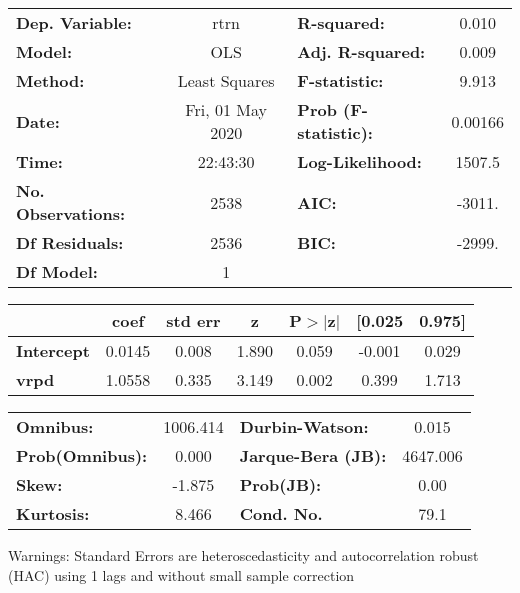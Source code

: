 \begin{center}
\begin{tabular}{lclc}
\toprule
\textbf{Dep. Variable:}    &       rtrn       & \textbf{  R-squared:         } &     0.010   \\
\textbf{Model:}            &       OLS        & \textbf{  Adj. R-squared:    } &     0.009   \\
\textbf{Method:}           &  Least Squares   & \textbf{  F-statistic:       } &     9.913   \\
\textbf{Date:}             & Fri, 01 May 2020 & \textbf{  Prob (F-statistic):} &  0.00166    \\
\textbf{Time:}             &     22:43:30     & \textbf{  Log-Likelihood:    } &    1507.5   \\
\textbf{No. Observations:} &        2538      & \textbf{  AIC:               } &    -3011.   \\
\textbf{Df Residuals:}     &        2536      & \textbf{  BIC:               } &    -2999.   \\
\textbf{Df Model:}         &           1      & \textbf{                     } &             \\
\bottomrule
\end{tabular}
\begin{tabular}{lcccccc}
                   & \textbf{coef} & \textbf{std err} & \textbf{z} & \textbf{P$> |$z$|$} & \textbf{[0.025} & \textbf{0.975]}  \\
\midrule
\textbf{Intercept} &       0.0145  &        0.008     &     1.890  &         0.059        &       -0.001    &        0.029     \\
\textbf{vrpd}      &       1.0558  &        0.335     &     3.149  &         0.002        &        0.399    &        1.713     \\
\bottomrule
\end{tabular}
\begin{tabular}{lclc}
\textbf{Omnibus:}       & 1006.414 & \textbf{  Durbin-Watson:     } &    0.015  \\
\textbf{Prob(Omnibus):} &   0.000  & \textbf{  Jarque-Bera (JB):  } & 4647.006  \\
\textbf{Skew:}          &  -1.875  & \textbf{  Prob(JB):          } &     0.00  \\
\textbf{Kurtosis:}      &   8.466  & \textbf{  Cond. No.          } &     79.1  \\
\bottomrule
\end{tabular}
\end{center}

Warnings: \newline
 [1] Standard Errors are heteroscedasticity and autocorrelation robust (HAC) using 1 lags and without small sample correction